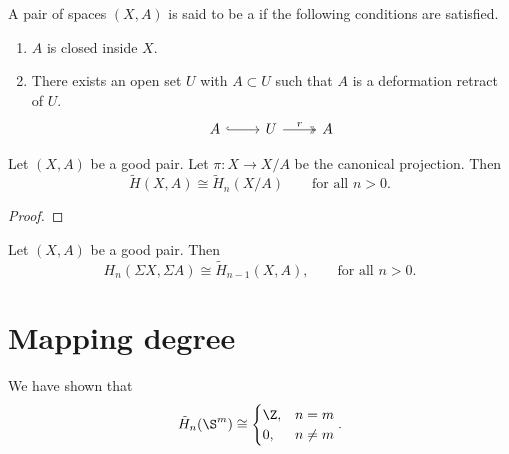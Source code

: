 \documentclass[main.tex]{subfiles}
\begin{document}
\begin{definition}
  \label{def:good_pair}
  A pair of spaces $(X, A)$ is said to be a  if the following conditions are satisfied.
  \begin{enumerate}
    \item $A$ is closed inside $X$.

    \item There exists an open set $U$ with $A \subset U$ such that $A$ is a deformation retract of $U$.
      \begin{equation*}
        \begin{tikzcd}
          A
          \arrow[r, hook]
          & U
          \arrow[r, two heads, "r"]
          & A
        \end{tikzcd}
      \end{equation*}
  \end{enumerate}
\end{definition}

\begin{proposition}
  \label{prop:relation_between_relative_reduced_homology}
  Let $(X, A)$ be a good pair. Let $\pi\colon X \to X/A$ be the canonical projection. Then
  \begin{equation*}
    \tilde{H}(X, A) \cong \tilde{H}_{n}(X/A) \qquad \text{for all }n > 0.
  \end{equation*}
\end{proposition}
\begin{proof}

\end{proof}

\begin{theorem}
  \label{thm:suspension_isomorphism}
  Let $(X, A)$ be a good pair. Then
  \begin{equation*}
    H_{n}(\Sigma X, \Sigma A) \cong \tilde{H}_{n-1}(X, A),\qquad \text{for all }n > 0.
  \end{equation*}
\end{theorem}

\section{Mapping degree}
\label{sec:mapping_degree}

We have shown that
\begin{equation*}
  \tilde{H}_{n}(\S^{m}) \cong
  \begin{cases}
    \Z, &n = m \\
    0, & n \neq m
  \end{cases}.
\end{equation*}
\end{document}
